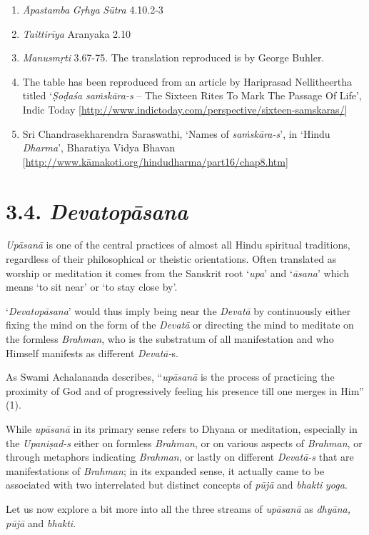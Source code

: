 \begin{enumerate}
\item
  \emph{Āpastamba} \emph{Gṛhya} \emph{Sūtra} 4.10.2-3
\item
  \emph{Taittirīya} Aranyaka 2.10
\item
  \emph{Manusmṛti} 3.67-75. The translation reproduced is by George Buhler.
\item
  The table has been reproduced from an article by Hariprasad Nellitheertha titled `\emph{Ṣoḍaśa} \emph{saṁskāra-s} -- The Sixteen Rites To Mark The Passage Of Life', Indic Today {[}\url{http://www.indictoday.com/perspective/sixteen-samskaras/}{]}
\item
  Sri Chandrasekharendra Saraswathi, `Names of \emph{saṁskāra-s}', in `Hindu \emph{Dharma}', Bharatiya Vidya Bhavan {[}\url{http://www.kāmakoti.org/hindudharma/part16/chap8.htm}{]}
\end{enumerate}

\section*{3.4. \emph{Devatopāsana}}

\emph{Upāsanā} is one of the central practices of almost all Hindu spiritual traditions, regardless of their philosophical or theistic orientations. Often translated as worship or meditation it comes from the Sanskrit root `\emph{upa}' and `\emph{āsana}' which means `to sit near' or `to stay close by'.

`\emph{Devatopāsana}' would thus imply being near the \emph{Devatā} by continuously either fixing the mind on the form of the \emph{Devatā} or directing the mind to meditate on the formless \emph{Brahman}, who is the substratum of all manifestation and who Himself manifests as different \emph{Devatā-}s.

As Swami Achalananda describes, ``\emph{upāsanā} is the process of practicing the proximity of God and of progressively feeling his presence till one merges in Him'' (1).

While \emph{upāsanā} in its primary sense refers to Dhyana or meditation, especially in the \emph{Upaniṣad-s} either on formless \emph{Brahman}, or on various aspects of \emph{Brahman}, or through metaphors indicating \emph{Brahman}, or lastly on different \emph{Devatā-s} that are manifestations of \emph{Brahman}; in its expanded sense, it actually came to be associated with two interrelated but distinct concepts of \emph{pūjā} and \emph{bhakti} \emph{yoga}.

Let us now explore a bit more into all the three streams of \emph{upāsanā} as \emph{dhyāna, pūjā} and \emph{bhakti}.

